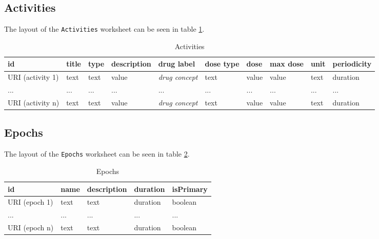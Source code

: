 \documentclass[a4paper,10pt]{article}
\begin{document}
\subsection*{Activities}
The layout of the \texttt{Activities} worksheet can be seen in table \ref{table:Activities}.
\begin{table}[h]
  \centering
  \caption{Activities}
  \small
  \label{table:Activities}
  \begin{tabular}{|l|l|l|l|l|l|l|l|l|l|}
    \hline
    \textbf{id}      & \textbf{title} & \textbf{type} & \textbf{description} & \textbf{drug label}   & \textbf{dose type} & \textbf{dose} & \textbf{max dose} & \textbf{unit} & \textbf{periodicity} \\ \hline
    URI (activity 1) & text           & text          & value                & \textit{drug concept} & text               & value         & value             & text          & duration             \\ \hline
    ...              & ...            & ...           & ...                  & ...                   & ...                & ...           & ...               & ...           & ...                  \\ \hline
    URI (activity n) & text           & text          & value                & \textit{drug concept} & text               & value         & value             & text          & duration             \\ \hline
  \end{tabular}
\end{table}

\subsection*{Epochs}
The layout of the \texttt{Epochs} worksheet can be seen in table \ref{table:Epochs}.
\begin{table}[!h]
  \centering
  \caption{Epochs}
  \label{table:Epochs}
  \begin{tabular}{|l|l|l|l|l|}
    \hline
    \textbf{id} & \textbf{name} & \textbf{description} & \textbf{duration} & \textbf{isPrimary} \\ \hline
    URI (epoch 1)& text           & text                 & duration                & boolean  \\ \hline
    ...         & ...          & ...                 & ...                & ...  \\ \hline
    URI (epoch n)& text           & text                 & duration                & boolean  \\ \hline
  \end{tabular}
\end{table}
\end{document}
